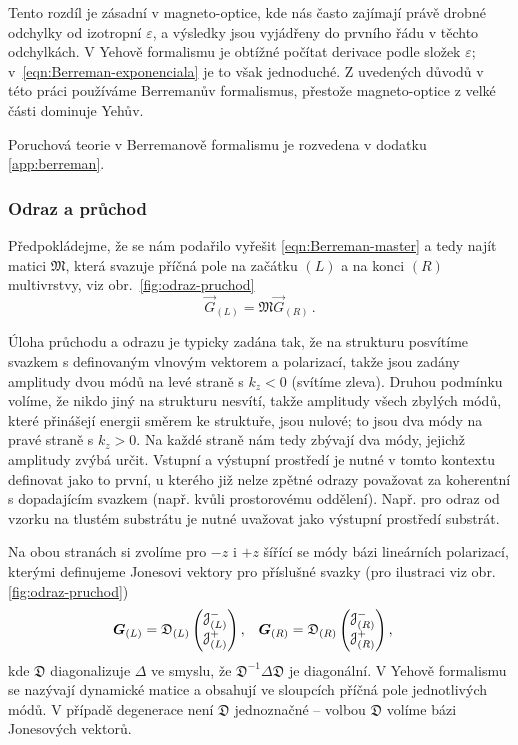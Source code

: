 Tento rozdíl je zásadní v magneto-optice, kde nás často zajímají právě drobné odchylky od izotropní $\varepsilon$, a výsledky jsou vyjádřeny do prvního řádu v těchto odchylkách.
V Yehově formalismu je obtížné počítat derivace podle složek $\varepsilon$; v~\eqref{eqn:Berreman-exponenciala} je to však jednoduché\cite{bertrandGeneralAnalyticalTreatment2001}.
Z uvedených důvodů v této práci používáme Berremanův formalismus, přestože magneto-optice z velké části dominuje Yehův.

Poruchová teorie v Berremanově formalismu je rozvedena v dodatku \ref{app:berreman}.

\subsubsection*{Odraz a průchod}

Předpokládejme, že se nám podařilo vyřešit \eqref{eqn:Berreman-master} a tedy najít matici $\mathfrak{M}$, která svazuje příčná pole na začátku $(L)$ a na konci $(R)$ multivrstvy, viz obr.~\ref{fig:odraz-pruchod}
\begin{equation}
    \label{eqn:prenosova-matice-M}
    \vec{G}_{(L)}=\mathfrak{M} \vec{G}_{(R)} \,.
\end{equation}


Úloha průchodu a odrazu je typicky zadána tak, že na strukturu posvítíme svazkem s definovaným vlnovým vektorem a polarizací, takže jsou zadány amplitudy dvou módů na levé straně s $k_z < 0$ (svítíme zleva).
Druhou podmínku volíme, že nikdo jiný na strukturu nesvítí, takže amplitudy všech zbylých módů, které přinášejí energii směrem ke struktuře, jsou nulové; to jsou dva módy na pravé straně s $k_z > 0$.
Na každé straně nám tedy zbývají dva módy, jejichž amplitudy zvýbá určit.
Vstupní a výstupní prostředí je nutné v tomto kontextu definovat jako to první, u kterého již nelze zpětné odrazy považovat za koherentní s dopadajícím svazkem (např. kvůli prostorovému oddělení).
Např. pro odraz od vzorku na tlustém substrátu je nutné uvažovat jako výstupní prostředí substrát.

Na obou stranách si zvolíme pro $-z$ i $+z$ šířící se módy bázi lineárních polarizací, kterými definujeme Jonesovi vektory pro příslušné svazky (pro ilustraci viz obr. \ref{fig:odraz-pruchod})
\begin{align}
    \label{eqn:dynamicke-LR}
    \bm{G}_{(L)} 
    &=\mathfrak{D}_{(L)} \begin{pmatrix} \mathcal{J}^-_{(L)} \\ \mathcal{J}^+_{(L)} \end{pmatrix} , 
    & \bm{G}_{(R)} 
    &=\mathfrak{D}_{(R)} \begin{pmatrix} \mathcal{J}^-_{(R)} \\ \mathcal{J}^+_{(R)} \end{pmatrix} ,
\end{align}
kde $\mathfrak{D}$ diagonalizuje $\Delta$ ve smyslu, že $\mathfrak{D}^{-1}\Delta \mathfrak{D}$ je diagonální.
V Yehově formalismu se nazývají dynamické matice a obsahují ve sloupcích příčná pole jednotlivých módů.
V případě degenerace není $\mathfrak{D}$ jednoznačné -- volbou $\mathfrak{D}$ volíme bázi Jonesových vektorů.


